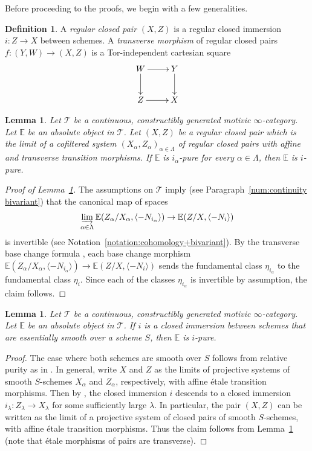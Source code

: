 \documentclass[11pt]{article}
\numberwithin{equation}{section}\renewcommand{\encodingdefault}{TU}
\newcommand{\T}{\mathscr T}
\newcommand{\E}{\mathbb E}
\newcommand{\vb}[1]{\langle#1\rangle}
\DeclareMathOperator{\ilim}{\varinjlim}
\newtheorem{lm}[thm]{Lemma}
\theoremstyle{remark}
\theoremstyle{definition}
\newtheorem{df}[thm]{Definition}
\numberwithin{equation}{thm}
\begin{document}
Before proceeding to the proofs, we begin with a few generalities.

\begin{df}
\label{df:trans_cl_pair}
A \emph{regular closed pair} $(X,Z)$ is a regular closed immersion \hbox{$i\!:\!Z\!\to\!X$} between schemes. A \emph{transverse morphism} of regular closed pairs $f:(Y,W)\to (X,Z)$ is a Tor-independent cartesian square
\begin{equation*}
\xymatrix{
W \ar[r]\ar[d]
& Y \ar[d]
\\
Z \ar[r]
& X
}
\end{equation*}
\end{df}

\begin{lm}
\label{lem:pur_limit}
Let $\T$ be a continuous, constructibly generated motivic $\infty$-category.
Let $\E$ be an absolute object in $\T$.
Let $(X,Z)$ be a regular closed pair which is the limit of a cofiltered system $(X_\alpha,Z_\alpha)_{\alpha\in\Lambda}$ of regular closed pairs with affine and transverse transition morphisms.
If $\E$ is $i_\alpha$-pure for every $\alpha\in\Lambda$, then $\E$ is $i$-pure.
\end{lm}

\begin{proof}[Proof of Lemma~\ref{lem:pur_limit}]
The assumptions on $\T$ imply (see Paragraph~\ref{num:continuity bivariant}) that the canonical map of spaces
\begin{equation*}
\ilim_{\alpha\in\Lambda} \E(Z_\alpha/X_\alpha, \vb{-N_{i_\alpha}}) \to \E(Z/X, \vb{-N_i})
\end{equation*}
is invertible (see Notation~\ref{notation:cohomology+bivariant}).
By the transverse base change formula \cite[Th.\,3.2.21]{DJK}, each base change morphism $\E(Z_\alpha/X_\alpha, \vb{-N_{i_\alpha}}) \to \E(Z/X, \vb{-N_i})$ sends the fundamental class $\eta_{i_\alpha}$ to the fundamental class $\eta_i$.
Since each of the classes $\eta_{i_\alpha}$ is invertible by assumption, the claim follows.
\end{proof}

\begin{lm}
\label{lm:pur_ess_sm}
Let $\T$ be a continuous, constructibly generated motivic $\infty$-category.
Let $\E$ be an absolute object in $\T$.
If $i$ is a closed immersion between schemes that are essentially smooth over a scheme $S$, then $\E$ is $i$-pure.
\end{lm}
\begin{proof}
The case where both schemes are smooth over $S$ follows from relative purity as in \cite[Prop.\,4.3.10(i)]{DJK}.
In general, write $X$ and $Z$ as the limits of projective systems of smooth $S$-schemes $X_\alpha$ and $Z_\alpha$, respectively, with affine étale transition morphisms.
Then by \cite[Th.\,8.8.2(ii), Prop.\,8.6.3]{EGA4}, the closed immersion $i$ descends to a closed immersion $i_\lambda : Z_\lambda \to X_\lambda$ for some sufficiently large $\lambda$.
In particular, the pair $(X, Z)$ can be written as the limit of a projective system of closed pairs of smooth $S$-schemes, with affine étale transition morphisms.
Thus the claim follows from Lemma~\ref{lem:pur_limit} (note that étale morphisms of pairs are transverse).
\end{proof}
\end{document}
